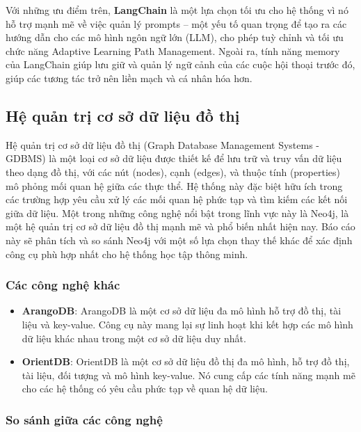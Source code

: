 Với những ưu điểm trên, \textbf{LangChain} là một lựa chọn tối ưu cho hệ thống vì nó hỗ trợ mạnh mẽ về việc quản lý prompts – một yếu tố quan trọng để tạo ra các hướng dẫn cho các mô hình ngôn ngữ lớn (LLM), cho phép tuỳ chỉnh và tối ưu chức năng Adaptive Learning Path Management. Ngoài ra, tính năng memory của LangChain giúp lưu giữ và quản lý ngữ cảnh của các cuộc hội thoại trước đó, giúp các tương tác trở nên liền mạch và cá nhân hóa hơn.
\subsection{Hệ quản trị cơ sở dữ liệu đồ thị}

Hệ quản trị cơ sở dữ liệu đồ thị (Graph Database Management Systems - GDBMS) là một loại cơ sở dữ liệu được thiết kế để lưu trữ và truy vấn dữ liệu theo dạng đồ thị, với các nút (nodes), cạnh (edges), và thuộc tính (properties) mô phỏng mối quan hệ giữa các thực thể. Hệ thống này đặc biệt hữu ích trong các trường hợp yêu cầu xử lý các mối quan hệ phức tạp và tìm kiếm các kết nối giữa dữ liệu. Một trong những công nghệ nổi bật trong lĩnh vực này là Neo4j, là một hệ quản trị cơ sở dữ liệu đồ thị mạnh mẽ và phổ biến nhất hiện nay. Báo cáo này sẽ phân tích và so sánh Neo4j với một số lựa chọn thay thế khác để xác định công cụ phù hợp nhất cho hệ thống học tập thông minh.

\subsubsection{Các công nghệ khác}

\begin{itemize} \item \textbf{ArangoDB}: ArangoDB là một cơ sở dữ liệu đa mô hình hỗ trợ đồ thị, tài liệu và key-value. Công cụ này mang lại sự linh hoạt khi kết hợp các mô hình dữ liệu khác nhau trong một cơ sở dữ liệu duy nhất. \item \textbf{OrientDB}: OrientDB là một cơ sở dữ liệu đồ thị đa mô hình, hỗ trợ đồ thị, tài liệu, đối tượng và mô hình key-value. Nó cung cấp các tính năng mạnh mẽ cho các hệ thống có yêu cầu phức tạp về quan hệ dữ liệu. \end{itemize}

\subsubsection{So sánh giữa các công nghệ}

